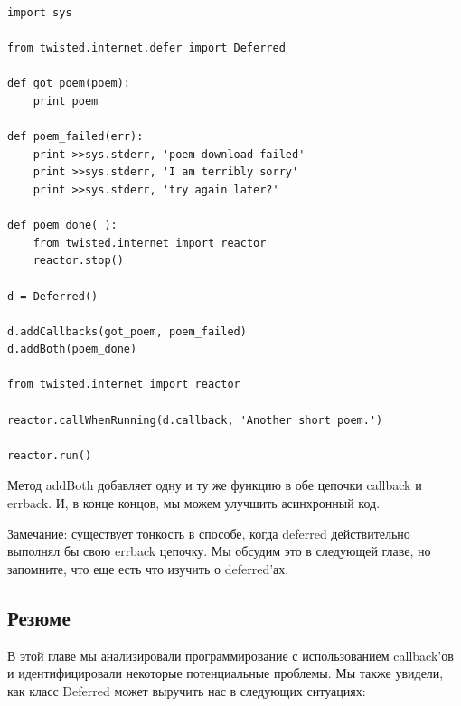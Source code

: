 \begin{scriptsize}\begin{verbatim}
import sys

from twisted.internet.defer import Deferred

def got_poem(poem):
    print poem

def poem_failed(err):
    print >>sys.stderr, 'poem download failed'
    print >>sys.stderr, 'I am terribly sorry'
    print >>sys.stderr, 'try again later?'

def poem_done(_):
    from twisted.internet import reactor
    reactor.stop()

d = Deferred()

d.addCallbacks(got_poem, poem_failed)
d.addBoth(poem_done)

from twisted.internet import reactor

reactor.callWhenRunning(d.callback, 'Another short poem.')

reactor.run()
\end{verbatim}\end{scriptsize}

Метод addBoth добавляет одну и ту же функцию в обе цепочки 
callback и errback. И, в конце концов, мы можем улучшить асинхронный код.


Замечание: существует тонкость в способе, когда 
deferred действительно выполнял бы свою errback цепочку. 
Мы обсудим это в следующей главе, но запомните, что еще есть что 
изучить о deferred'ах.


\subsection{Резюме}

В этой главе мы анализировали программирование с использованием 
callback'ов и идентифицировали некоторые потенциальные проблемы. 
Мы также увидели, как класс Deferred может выручить нас в следующих 
ситуациях:

